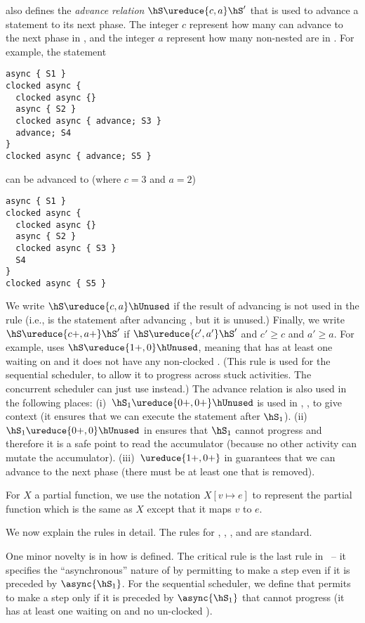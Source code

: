  also defines the \emph{advance relation} $\hS \ureduce{c,a} \hS'$
    that is used to advance a statement to its next phase.
The integer $c$ represent how many  can advance to the next phase in \hS,
    and the integer $a$ represent how many non-nested  are in \hS.
For example, the statement
\begin{lstlisting}
async { S1 }
clocked async {
  clocked async {}
  async { S2 }
  clocked async { advance; S3 }
  advance; S4
}
clocked async { advance; S5 }
\end{lstlisting}
can be advanced to (where $c=3$ and $a=2$)
\begin{lstlisting}
async { S1 }
clocked async {
  clocked async {}
  async { S2 }
  clocked async { S3 }
  S4
}
clocked async { S5 }
\end{lstlisting}
We write  $\hS \ureduce{c,a} \hUnused$ if the result of advancing \hS is not used in the rule
    (i.e., \hUnused is the statement after advancing \hS, but it is unused.)
Finally, we write $\hS \ureduce{c+,a+} \hS'$ if $\hS \ureduce{c',a'} \hS'$ and $c'\geq c$ and $a' \geq a$.
For example,  uses $\hS \ureduce{1+,0} \hUnused$,
    meaning that \hS has at least one  waiting on \xadvance
    and it does not have any non-clocked .
(This rule is used for the sequential scheduler, to allow it to progress across stuck activities.
    The concurrent scheduler can just use  instead.)
The advance relation is also used in the following places:
(i)~$\hS_1 \ureduce{0+,0+} \hUnused$ is used in , , 
    to give context (it ensures that we can execute the statement after $\hS_1$).
(ii)~$\hS_1 \ureduce{0+,0} \hUnused$ in  ensures that $\hS_1$ cannot progress
    and therefore it is a safe point to read the accumulator (because no other activity can mutate the accumulator).
(iii)~$\ureduce{1+,0+}$ in  guarantees that we can advance to the next phase
    (there must be at least one \xadvance that is removed).


For $X$ a partial function, we use the notation
$X[v \mapsto e]$ to represent the partial function which is the same
as $X$ except that it maps $v$ to $e$.

We now explain the rules in detail.
The rules for , , , and 
    are standard.

One minor novelty is in how \hasync{} is
defined. The critical rule is the last rule in~ -- it
specifies the ``asynchronous'' nature of \hasync{} by permitting \hS{}
to make a step even if it is preceded by $\async{\hS_1}$.
For the sequential scheduler, we define 
    that permits \hS{}
to make a step only if it is preceded by $\async{\hS_1}$ that cannot progress
    (it has at least one  waiting on \xadvance and no un-clocked \async).


